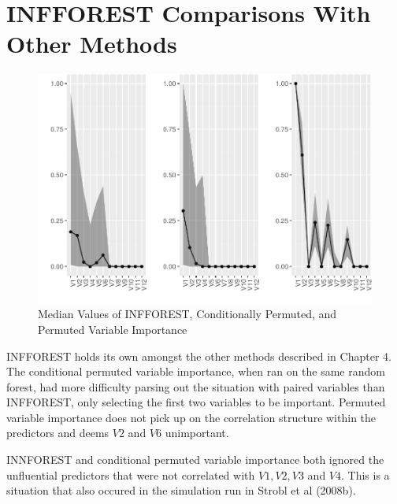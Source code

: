 \documentclass[12pt,twoside]{reedthesis}
\begin{document}
  \chapter{INFFOREST Comparisons With Other
  Methods}\label{infforest-comparisons-with-other-methods}
  
  \begin{figure}[htbp]
  \centering
  \includegraphics{Thesis_files/figure-latex/figcomparisons-1.pdf}
  \caption{\label{fig:figcomparisons}Median Values of INFFOREST, Conditionally
  Permuted, and Permuted Variable Importance}
  \end{figure}
  
  INFFOREST holds its own amongst the other methods described in Chapter
  4. The conditional permuted variable importance, when ran on the same
  random forest, had more difficulty parsing out the situation with paired
  variables than INFFOREST, only selecting the first two variables to be
  important. Permuted variable importance does not pick up on the
  correlation structure within the predictors and deems \(V2\) and \(V6\)
  unimportant.
  
  INNFOREST and conditional permuted variable importance both ignored the
  unfluential predictors that were not correlated with \(V1,V2,V3\) and
  \(V4\). This is a situation that also occured in the simulation run in
  Strobl et al (2008b).


\end{document}
